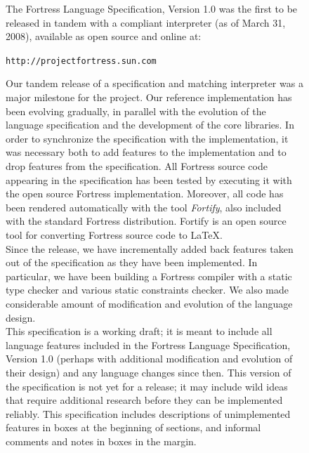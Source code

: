 %
%
%
%

\begin{figure}[p]
The Fortress Language Specification, Version 1.0\cite{Fortress} was the first to be
released in tandem with a compliant interpreter (as of March 31, 2008),
available as open source and online at:\\

\begin{center}
{\tt http://projectfortress.sun.com}\\[1em]
\end{center}
Our tandem release of a specification and matching interpreter was a major
milestone for the project.
Our reference implementation has been evolving gradually,
in parallel with the evolution of the language specification and
the development of the core libraries.  In order to synchronize
the specification with the implementation, it was necessary both to add
features to the implementation and to drop features from the specification.
All Fortress source code appearing in the specification has been
tested by executing it with the open source Fortress implementation. Moreover,
all code has been rendered automatically with the tool \emph{Fortify}, also
included with the standard Fortress distribution. Fortify is an open source tool
for converting Fortress source code to \LaTeX.\\


Since the release, we have incrementally added back
features taken out of the specification as they have been implemented.
In particular, we have been building a Fortress compiler with a static
type checker and various static constraints checker.
We also made considerable amount of modification and evolution of the
language design.\\


This specification is a working draft;
it is meant to include all language features included in
the Fortress Language Specification, Version 1.0\EXP{\beta{}}
(perhaps with additional modification and evolution of their design)
and any language changes since then.
This version of the specification is not yet for a release;
it may include wild ideas that require additional research before they can be
implemented reliably.
This specification includes descriptions of unimplemented features in boxes
at the beginning of sections,
and informal comments and notes in boxes in the margin.\\


\end{figure}
